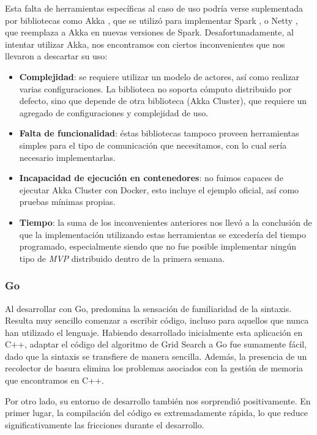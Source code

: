 \documentclass[11pt]{article}
\let\Oldsubsubsection\subsubsection
\renewcommand{\subsubsection}{\FloatBarrier\Oldsubsubsection}
\newcommand{\english}[1]{\textit{#1}}
\begin{document}
Esta falta de herramientas específicas al caso de uso podría verse suplementada por bibliotecas como Akka \cite{scala:lib:akka}, que se utilizó para implementar Spark \cite{scala:ex:spark}, o Netty \cite{scala:lib:netty}, que reemplaza a Akka en nuevas versiones de Spark. Desafortunadamente, al intentar utilizar Akka, nos encontramos con ciertos inconvenientes que nos llevaron a descartar su uso:
\begin{itemize}
    \item \textbf{Complejidad}: se requiere utilizar un modelo de actores, así como realizar varias configuraciones. La biblioteca no soporta cómputo distribuido por defecto, sino que depende de otra biblioteca (Akka Cluster), que requiere un agregado de configuraciones y complejidad de uso.
    \item \textbf{Falta de funcionalidad}: éstas bibliotecas tampoco proveen herramientas simples para el tipo de comunicación que necesitamos, con lo cual sería necesario implementarlas.
    \item \textbf{Incapacidad de ejecución en contenedores}: no fuimos capaces de ejecutar Akka Cluster con Docker, esto incluye el ejemplo oficial, así como pruebas mínimas propias.
    \item \textbf{Tiempo}: la suma de los inconvenientes anteriores nos llevó a la conclusión de que la implementación utilizando estas herramientas se excedería del tiempo programado, especialmente siendo que no fue posible implementar ningún tipo de \english{MVP} distribuido dentro de la primera semana.
\end{itemize}

\subsubsection{Go}

Al desarrollar con Go, predomina la sensación de familiaridad de la sintaxis. Resulta muy sencillo comenzar a escribir código, incluso para aquellos que nunca han utilizado el lenguaje. Habiendo desarrollado inicialmente esta aplicación en C++, adaptar el código del algoritmo de Grid Search a Go fue sumamente fácil, dado que la sintaxis se transfiere de manera sencilla. Además, la presencia de un recolector de basura elimina los problemas asociados con la gestión de memoria que encontramos en C++.

Por otro lado, su entorno de desarrollo también nos sorprendió positivamente. En primer lugar, la compilación del código es extremadamente rápida, lo que reduce significativamente las fricciones durante el desarrollo.
\end{document}
